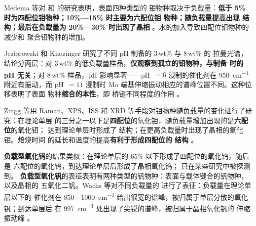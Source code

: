 Medema 等对  和  的研究表明，表面四种类型的
钼物种取决于负载量：\textbf{低于 5\% 时为四配位钼物种；10\%—15\% 时主要为六配位钼
物种；随负载量提高出现  结构；最后在负载量为 20\%—30\% 时出现了晶相
}。水的加入导致四配位钼物种的减少和
聚合钼物种的增加。

Jeziorowski 和 Knozinger 研究了不同 pH 制备的 3\,wt\% 与 8\,wt\%  的
拉曼光谱，结论分两层：对 3\,wt\% 的低负载量样品，\textbf{仅观察到孤立的钼物种，与制备
时的 pH 无关}；对 8\,wt\% 样品，pH 影响显著——pH~$=6$ 浸制的催化剂在 \qty{950}{cm^{-1}}
附近有振动，而 pH~$=11$ 浸制时 Mo 端基伸缩振动相应的谱峰位置不同。这种位移表明了表面
物种\textbf{缩合的本性}，即  桥键不同程度的作用
。

Zingg 等用 Raman、XPS、ISS 和 XRD 等手段对钼物种随负载量的变化进行了研究：在理论单层
的三分之一以下是\textbf{四配位}的氧化钼，随负载量增加出现的是\textbf{六配位}的氧化钼；
达到理论单层时形成了  结构；在更高负载量时出现了晶相的氧化钼。焙烧时间
的延长和温度的提高\textbf{有利于形成四配位的  结构}
。

\textbf{负载型氧化钨}的结果类似：在理论单层的 65\% 以下形成了四配位的氧化钨，随后是
六配位的氧化钨，到达理论单层后形成了晶相氧化钨； 只在某些研究中被探测到。
\textbf{负载型氧化钒}的表征表明有两种类型的钒物种：表面与载体键合的钒物种，以及晶相的
五氧化二钒。Wachs 等对不同负载量的  进行了表征：负载量在理论单层以下的
催化剂在 850—\qty{1000}{cm^{-1}} 给出很宽的谱峰，被归属于单层分散的氧化钒；到达单层后
在 \qty{997}{cm^{-1}} 处出现了尖锐的谱峰，被归属于晶相氧化钒的  伸缩振动峰
。

